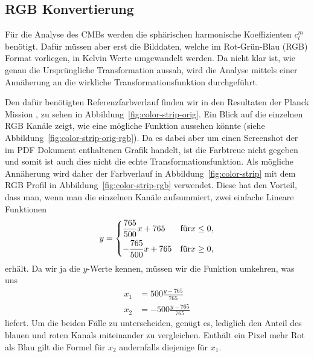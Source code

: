 \subsection{RGB Konvertierung}

Für die Analyse des CMBs werden die sphärischen harmonische Koeffizienten 
$c_l^m$ benötigt. Dafür müssen aber erst die Bilddaten, welche im Rot-Grün-Blau 
(RGB) Format vorliegen, in Kelvin Werte umgewandelt werden. Da nicht klar ist, 
wie genau die Ursprüngliche Transformation aussah, wird die Analyse mittels 
einer Annäherung an die wirkliche Transformationsfunktion durchgeführt.

Den dafür benötigten Referenzfarbverlauf finden wir in den Resultaten der 
Planck Mission \cite{cmb:planck_overview}, zu sehen in 
Abbildung~\ref{fig:color-strip-orig}. Ein Blick auf die einzelnen RGB Kanäle 
zeigt, wie eine mögliche Funktion aussehen könnte (siehe 
Abbildung~\ref{fig:color-strip-orig-rgb}). Da es dabei aber um einen Screenshot 
der im PDF Dokument enthaltenen Grafik handelt, ist die Farbtreue nicht gegeben 
und somit ist auch dies nicht die echte Transformationsfunktion. Als mögliche 
Annäherung wird daher der Farbverlauf in Abbildung~\ref{fig:color-strip} mit 
dem RGB Profil in Abbildung~\ref{fig:color-strip-rgb} verwendet. 
Diese hat den Vorteil, dass man, wenn man die einzelnen Kanäle aufsummiert, 
zwei einfache Lineare Funktionen
\begin{equation*}
	y =
	\begin{dcases}
		\frac{765}{500}x + 765 & \text{für} x \leq 0,\\
		-\frac{765}{500}x + 765 & \text{für} x \geq 0,\\
	\end{dcases}
\end{equation*}
erhält. Da wir ja die $y$-Werte kennen, müssen wir die Funktion umkehren, 
was uns
\begin{align*}
	x_1 &= 500\frac{y - 765}{765}\\
	x_2 &= -500\frac{y - 765}{765}
\end{align*}
liefert. Um die beiden Fälle zu unterscheiden, genügt es, lediglich den Anteil 
des blauen und roten Kanals miteinander zu vergleichen. Enthält ein Pixel mehr 
Rot als Blau gilt die Formel für $x_2$ andernfalls diejenige für $x_1$.

